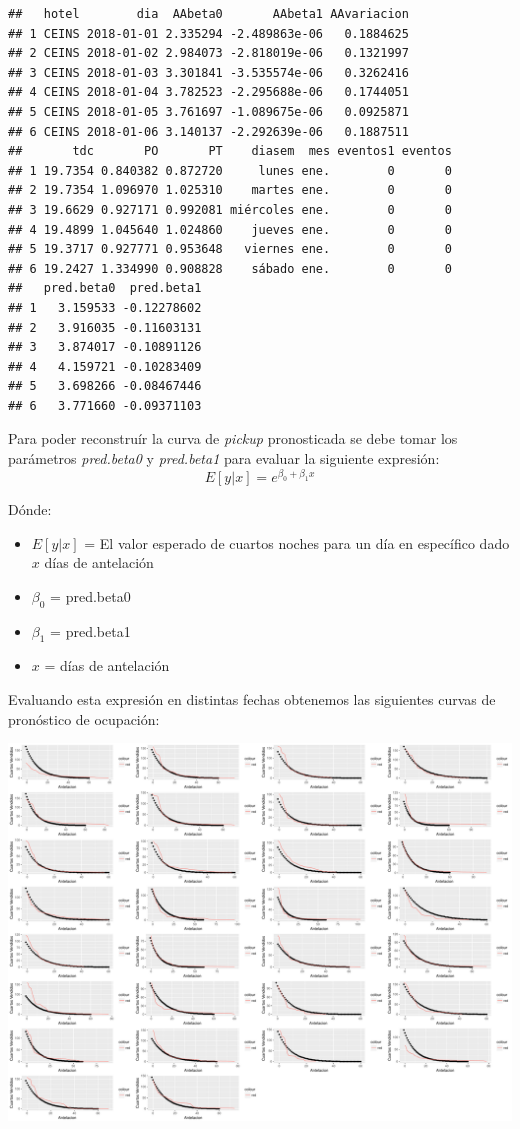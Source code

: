 \begin{verbatim}
##   hotel        dia  AAbeta0       AAbeta1 AAvariacion
## 1 CEINS 2018-01-01 2.335294 -2.489863e-06   0.1884625
## 2 CEINS 2018-01-02 2.984073 -2.818019e-06   0.1321997
## 3 CEINS 2018-01-03 3.301841 -3.535574e-06   0.3262416
## 4 CEINS 2018-01-04 3.782523 -2.295688e-06   0.1744051
## 5 CEINS 2018-01-05 3.761697 -1.089675e-06   0.0925871
## 6 CEINS 2018-01-06 3.140137 -2.292639e-06   0.1887511
##       tdc       PO       PT    diasem  mes eventos1 eventos
## 1 19.7354 0.840382 0.872720     lunes ene.        0       0
## 2 19.7354 1.096970 1.025310    martes ene.        0       0
## 3 19.6629 0.927171 0.992081 miércoles ene.        0       0
## 4 19.4899 1.045640 1.024860    jueves ene.        0       0
## 5 19.3717 0.927771 0.953648   viernes ene.        0       0
## 6 19.2427 1.334990 0.908828    sábado ene.        0       0
##   pred.beta0  pred.beta1
## 1   3.159533 -0.12278602
## 2   3.916035 -0.11603131
## 3   3.874017 -0.10891126
## 4   4.159721 -0.10283409
## 5   3.698266 -0.08467446
## 6   3.771660 -0.09371103
\end{verbatim}

Para poder reconstruír la curva de \emph{pickup} pronosticada se debe tomar los parámetros \emph{pred.beta0} y \emph{pred.beta1} para evaluar la siguiente expresión: $$E[y|x]=e^{\beta_0 + \beta_1x}$$

Dónde:
\begin{itemize}[noitemsep]
\item $E[y|x]$ = El valor esperado de cuartos noches para un día en específico dado $x$ días de antelación
\item $\beta_0$ = pred.beta0
\item $\beta_1$ = pred.beta1
\item $x$ = días de antelación
\end{itemize}

Evaluando esta expresión en distintas fechas obtenemos las siguientes curvas de pronóstico de ocupación:

\color{fgcolor}
\includegraphics[width=\maxwidth]{Figures/ValidacionModelo-1} 

